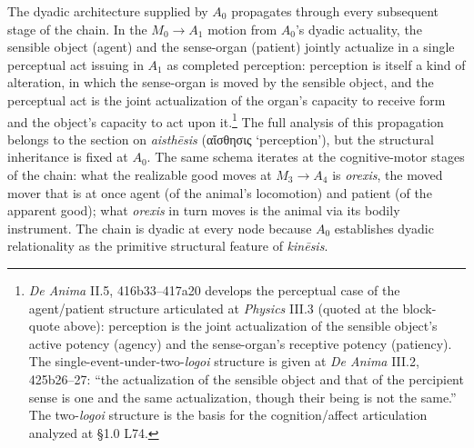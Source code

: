 \documentclass{article}
\newcommand{\gk}[1]{{\greekfont #1}}
\begin{document}
The dyadic architecture supplied by $A_0$ propagates through every subsequent stage of the chain. In the $M_0 \rightarrow A_1$ motion from $A_0$'s dyadic actuality, the sensible object (agent) and the sense-organ (patient) jointly actualize in a single perceptual act issuing in $A_1$ as completed perception: perception is itself a kind of alteration, in which the sense-organ is moved by the sensible object, and the perceptual act is the joint actualization of the organ's capacity to receive form and the object's capacity to act upon it.\footnote{\textit{De Anima} II.5, 416b33--417a20 develops the perceptual case of the agent/patient structure articulated at \textit{Physics} III.3 (quoted at the block-quote above): perception is the joint actualization of the sensible object's active potency (agency) and the sense-organ's receptive potency (patiency). The single-event-under-two-\textit{logoi} structure is given at \textit{De Anima} III.2, 425b26--27: ``the actualization of the sensible object and that of the percipient sense is one and the same actualization, though their being is not the same.'' The two-\textit{logoi} structure is the basis for the cognition/affect articulation analyzed at §1.0 L74.} The full analysis of this propagation belongs to the section on \textit{aisthēsis} (\gk{αἴσθησις} `perception'), but the structural inheritance is fixed at $A_0$. The same schema iterates at the cognitive-motor stages of the chain: what the realizable good moves at $M_3 \rightarrow A_4$ is \textit{orexis}, the moved mover that is at once agent (of the animal's locomotion) and patient (of the apparent good); what \textit{orexis} in turn moves is the animal via its bodily instrument. The chain is dyadic at every node because $A_0$ establishes dyadic relationality as the primitive structural feature of \textit{kinēsis}.
\end{document}
